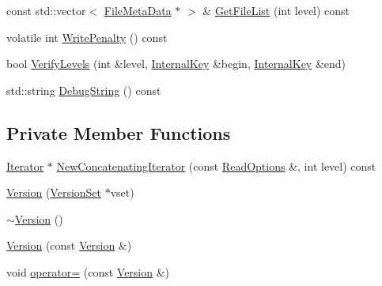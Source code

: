 \begin{DoxyCompactItemize}
\item 
const std\+::vector$<$ \hyperlink{structleveldb_1_1_file_meta_data}{File\+Meta\+Data} $\ast$ $>$ \& \hyperlink{classleveldb_1_1_version_afff96ab5e575e9644d840abace58f641}{Get\+File\+List} (int level) const 
\item 
volatile int \hyperlink{classleveldb_1_1_version_a397b69ef88bcfff1b8ba04655f3dc882}{Write\+Penalty} () const 
\item 
bool \hyperlink{classleveldb_1_1_version_afce9f04ba5b663eb9d80c3af49218c6a}{Verify\+Levels} (int \&level, \hyperlink{classleveldb_1_1_internal_key}{Internal\+Key} \&begin, \hyperlink{classleveldb_1_1_internal_key}{Internal\+Key} \&end)
\item 
std\+::string \hyperlink{classleveldb_1_1_version_a83d35444c8e7c617a3a70e4c9050ce08}{Debug\+String} () const 
\end{DoxyCompactItemize}
\subsection*{Private Member Functions}
\begin{DoxyCompactItemize}
\item 
\hyperlink{classleveldb_1_1_iterator}{Iterator} $\ast$ \hyperlink{classleveldb_1_1_version_a3dbfd700f06c4e31d28a6c494d6345c9}{New\+Concatenating\+Iterator} (const \hyperlink{structleveldb_1_1_read_options}{Read\+Options} \&, int level) const 
\item 
\hyperlink{classleveldb_1_1_version_a8b08a6273383b1d02f8e3e5023e015ee}{Version} (\hyperlink{classleveldb_1_1_version_set}{Version\+Set} $\ast$vset)
\item 
\hyperlink{classleveldb_1_1_version_ade39983be24e04a74882f810fd5b61c9}{$\sim$\+Version} ()
\item 
\hyperlink{classleveldb_1_1_version_a5a1a40f16c843b73c46c8a6f7710d742}{Version} (const \hyperlink{classleveldb_1_1_version}{Version} \&)
\item 
void \hyperlink{classleveldb_1_1_version_af0d9bd79b1cdcadcf2511601de1c92a9}{operator=} (const \hyperlink{classleveldb_1_1_version}{Version} \&)
\end{DoxyCompactItemize}
